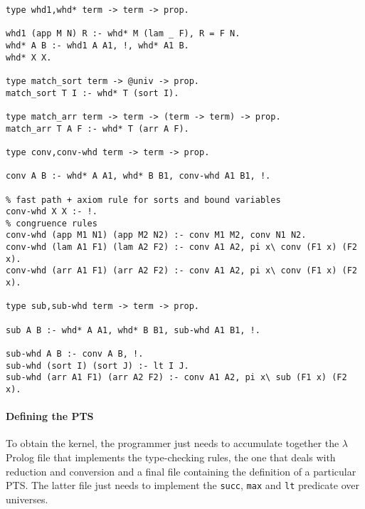 \documentclass{easychair}
\begin{document}
\begin{Verbatim}
type whd1,whd* term -> term -> prop.

whd1 (app M N) R :- whd* M (lam _ F), R = F N.
whd* A B :- whd1 A A1, !, whd* A1 B.
whd* X X.

type match_sort term -> @univ -> prop.
match_sort T I :- whd* T (sort I).

type match_arr term -> term -> (term -> term) -> prop.
match_arr T A F :- whd* T (arr A F).

type conv,conv-whd term -> term -> prop.

conv A B :- whd* A A1, whd* B B1, conv-whd A1 B1, !.

% fast path + axiom rule for sorts and bound variables
conv-whd X X :- !.
% congruence rules
conv-whd (app M1 N1) (app M2 N2) :- conv M1 M2, conv N1 N2.
conv-whd (lam A1 F1) (lam A2 F2) :- conv A1 A2, pi x\ conv (F1 x) (F2 x).
conv-whd (arr A1 F1) (arr A2 F2) :- conv A1 A2, pi x\ conv (F1 x) (F2 x).

type sub,sub-whd term -> term -> prop.

sub A B :- whd* A A1, whd* B B1, sub-whd A1 B1, !.

sub-whd A B :- conv A B, !.
sub-whd (sort I) (sort J) :- lt I J.
sub-whd (arr A1 F1) (arr A2 F2) :- conv A1 A2, pi x\ sub (F1 x) (F2 x).
\end{Verbatim}



\paragraph{Defining the PTS}\label{sec:eccpts}
To obtain the kernel, the programmer just needs to accumulate together the $\lambda$Prolog file that implements the type-checking rules, the one that deals with reduction and conversion and a final file containing the definition of a particular PTS. The latter file just needs to implement the \verb+succ+, \verb+max+ and \verb+lt+ predicate over universes.
\end{document}
